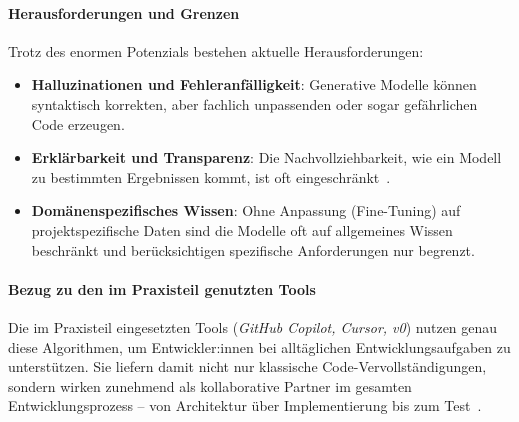 \paragraph{Herausforderungen und Grenzen}

Trotz des enormen Potenzials bestehen aktuelle Herausforderungen:
\begin{itemize}
    \item \textbf{Halluzinationen und Fehleranfälligkeit}: Generative Modelle können syntaktisch korrekten, aber fachlich unpassenden oder sogar gefährlichen Code erzeugen.
    \item \textbf{Erklärbarkeit und Transparenz}: Die Nachvollziehbarkeit, wie ein Modell zu bestimmten Ergebnissen kommt, ist oft eingeschränkt~\cite{esposito_generative_2025, nguyen-duc_generative_2023}.
    \item \textbf{Domänenspezifisches Wissen}: Ohne Anpassung (Fine-Tuning) auf projektspezifische Daten sind die Modelle oft auf allgemeines Wissen beschränkt und berücksichtigen spezifische Anforderungen nur begrenzt.
\end{itemize}

\paragraph{Bezug zu den im Praxisteil genutzten Tools}

Die im Praxisteil eingesetzten Tools (\textit{GitHub Copilot, Cursor, v0})
nutzen genau diese Algorithmen, um Entwickler:innen bei alltäglichen
Entwicklungsaufgaben zu unterstützen. Sie liefern damit nicht nur klassische
Code-Vervollständigungen, sondern wirken zunehmend als kollaborative Partner im
gesamten Entwicklungsprozess – von Architektur über Implementierung bis zum
Test~\cite{esposito_generative_2025, nguyen-duc_generative_2023}.

